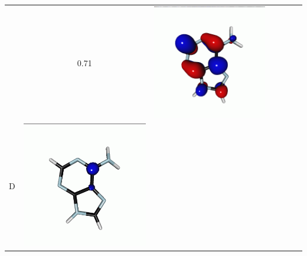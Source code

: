 \documentclass[journal=jctcce,manuscript=article]{achemso}
\begin{document}
\begin{table}[H]
\begin{tabular}{ l| c c c | c c c }
\begin{minipage}{0.2\textwidth}
    \end{minipage}
    & 0.71
    & 
    \begin{minipage}{0.2\textwidth}
        \centering
        \includegraphics[scale=0.10]{NTO/Adenine_C/3p_Cs.png}
    \end{minipage}
    \\
            D &  
    \begin{minipage}{0.2\textwidth}
        \centering
        \includegraphics[scale=0.10]{NTO/Adenine_C/5h_C1.png}

\end{minipage}
\end{tabular}
\end{table}
\end{document}
